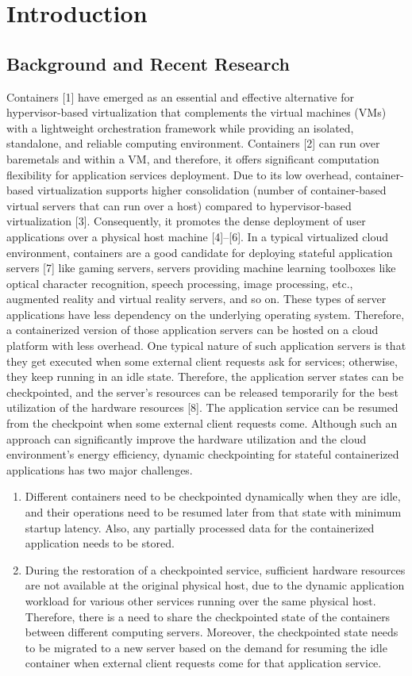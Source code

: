 \chapter{Introduction}

\section{Background and Recent Research}
Containers [1] have emerged as an essential and effective alternative for hypervisor-based virtualization that complements
the virtual machines (VMs) with a lightweight orchestration
framework while providing an isolated, standalone, and reliable computing environment. Containers [2] can run over baremetals and within a VM, and therefore, it offers significant
computation flexibility for application services deployment.
Due to its low overhead, container-based virtualization supports higher consolidation (number of container-based virtual
servers that can run over a host) compared to hypervisor-based
virtualization [3]. Consequently, it promotes the dense deployment of user applications over a physical host machine [4]–[6].
In a typical virtualized cloud environment, containers are a
good candidate for deploying stateful application servers [7]
like gaming servers, servers providing machine learning toolboxes like optical character recognition, speech processing,
image processing, etc., augmented reality and virtual reality
servers, and so on. These types of server applications have less dependency on the underlying operating system. Therefore,
a containerized version of those application servers can be
hosted on a cloud platform with less overhead. One typical
nature of such application servers is that they get executed
when some external client requests ask for services; otherwise,
they keep running in an idle state. Therefore, the application
server states can be checkpointed, and the server’s resources
can be released temporarily for the best utilization of the
hardware resources [8]. The application service can be resumed from the checkpoint when some external client requests
come. Although such an approach can significantly improve
the hardware utilization and the cloud environment’s energy
efficiency, dynamic checkpointing for stateful containerized
applications has two major challenges. 
\begin{enumerate}[i]
\item Different containers need to be checkpointed dynamically when they are idle, and their operations need
to be resumed later from that state with minimum
startup latency. Also, any partially processed data for
the containerized application needs to be stored.
\item During the restoration of a checkpointed service, sufficient hardware resources are not available at the original
physical host, due to the dynamic application workload
for various other services running over the same physical
host. Therefore, there is a need to share the checkpointed
state of the containers between different computing
servers. Moreover, the checkpointed state needs to be
migrated to a new server based on the demand for
resuming the idle container when external client requests
come for that application service.
\end{enumerate}

